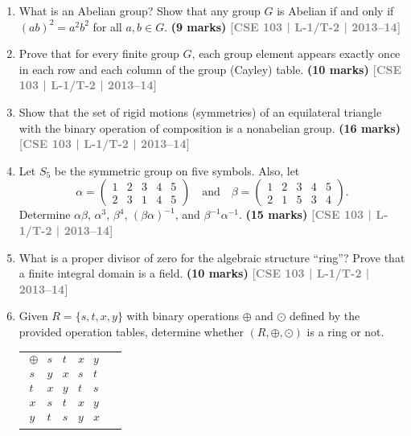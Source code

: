 \documentclass[12pt,a3paper]{article}
\newcommand{\yr}[1]{\hfill\textcolor{gray}{\small\textbf{[#1]}}}
\newcommand{\mk}[1]{\textcolor{orange!70!black}{\small\textbf{(#1 marks)}}}
\begin{document}
\begin{enumerate}
\item What is an Abelian group? Show that any group $G$ is Abelian if and only if $(ab)^2 = a^2 b^2$ for all $a, b \in G$.
\mk{9} \yr{CSE 103 | L-1/T-2 | 2013--14}

\item Prove that for every finite group $G$, each group element appears exactly once in each row and each column of the group (Cayley) table.
\mk{10} \yr{CSE 103 | L-1/T-2 | 2013--14}

\item Show that the set of rigid motions (symmetries) of an equilateral triangle with the binary operation of composition is a nonabelian group.
\mk{16} \yr{CSE 103 | L-1/T-2 | 2013--14}

\item Let $S_5$ be the symmetric group on five symbols. Also, let
\[
  \alpha = \begin{pmatrix}1&2&3&4&5\\2&3&1&4&5\end{pmatrix} \quad \text{and} \quad
  \beta = \begin{pmatrix}1&2&3&4&5\\2&1&5&3&4\end{pmatrix}.
\]
Determine $\alpha\beta$, $\alpha^3$, $\beta^4$, $(\beta\alpha)^{-1}$, and $\beta^{-1}\alpha^{-1}$.
\mk{15} \yr{CSE 103 | L-1/T-2 | 2013--14}

\item What is a proper divisor of zero for the algebraic structure ``ring''? Prove that a finite integral domain is a field.
\mk{10} \yr{CSE 103 | L-1/T-2 | 2013--14}





\item Given $R = \{s, t, x, y\}$ with binary operations $\oplus$ and $\odot$ defined by the provided operation tables, determine whether $(R, \oplus, \odot)$ is a ring or not.

\begin{center}
  \begin{tabular}{cc}
        
        $\begin{array}{c|cccc}
            \oplus & s & t & x & y \\
            \hline
            s & y & x & s & t \\
            t & x & y & t & s \\
            x & s & t & x & y \\
            y & t & s & y & x 
        \end{array}$
        

\end{tabular}
\end{center}
\end{enumerate}
\end{document}
